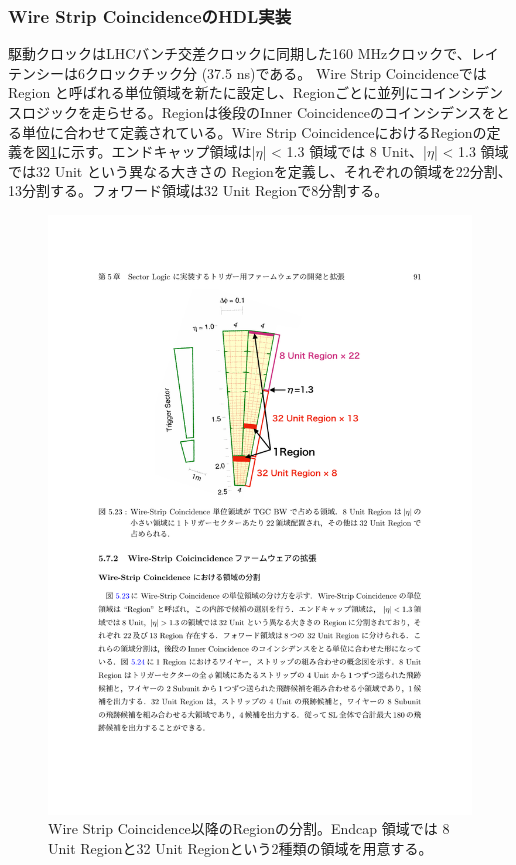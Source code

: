 \subsubsection*{Wire Strip CoincidenceのHDL実装}
駆動クロックはLHCバンチ交差クロックに同期した160 MHzクロックで、レイテンシーは6クロックチック分 (37.5 ns)である。
Wire Strip Coincidenceでは Region と呼ばれる単位領域を新たに設定し、Regionごとに並列にコインシデンスロジックを走らせる。Regionは後段のInner Coincidenceのコインシデンスをとる単位に合わせて定義されている。Wire Strip CoincidenceにおけるRegionの定義を図\ref{WS_region}に示す。エンドキャップ領域は|$\eta$| < 1.3 領域では 8 Unit、|$\eta$| < 1.3 領域では32 Unit という異なる大きさの Regionを定義し、それぞれの領域を22分割、13分割する。フォワード領域は32 Unit Regionで8分割する。

\begin{figure} 
\centering
\includegraphics[width=16cm]{fig/SL/WS_region.pdf}
\caption[Wire Strip Coincidence以降のRegionの分割]{Wire Strip Coincidence以降のRegionの分割\cite{mt_kawamoto}。Endcap 領域では 8 Unit Regionと32 Unit Regionという2種類の領域を用意する。}
\label{WS_region}
\end{figure}

